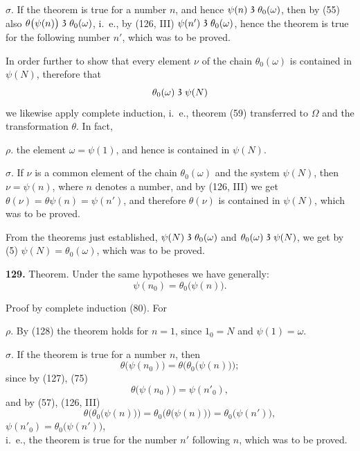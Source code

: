 \documentclass[oneside]{book}
\newcommand\partof{\mathrel{\raisebox{0.45ex}{$\mathfrak{3}$}}}   %
\newcommand\mypara{\medskip\textbf}
\begin{document}
$\sigma$. If the theorem is true for a number $n$, and hence
$\psi(n) \partof \theta_0(\omega)$, then by (55) also $\theta\bigl(\psi(n)\bigr) \partof \theta_0(\omega)$, i.~e., by
(126, III) $\psi(n') \partof \theta_0(\omega)$, hence the theorem is true for
the following number $n'$, which was to be proved.

In order further to show that every element $\nu$ of
the chain $\theta_0(\omega)$ is contained in $\psi(N)$, therefore that
\[
\theta_0(\omega) \partof \psi(N)
\]
we likewise apply complete induction, i.~e., theorem
(59) transferred to $\Omega$ and the transformation $\theta$. In
fact,

$\rho$. the element $\omega=\psi(1)$, and hence is contained in
$\psi(N)$.

$\sigma$. If $\nu$ is a common element of the chain $\theta_0(\omega)$
and the system $\psi(N)$, then $\nu=\psi(n)$, where $n$ denotes
a number, and by (126, III) we get $\theta(\nu) = \theta\psi(n) = \psi(n')$,
and therefore $\theta(\nu)$ is contained in $\psi(N)$, which
was to be proved.

From the theorems just established, $\psi(N) \partof \theta_0(\omega)$
and $\theta_0(\omega) \partof \psi(N)$, we get by (5) $\psi(N) = \theta_0(\omega)$, which
was to be proved.

\mypara{129.} Theorem. Under the same hypotheses we
have generally:
\[
\psi(n_0) = \theta_0\bigl(\psi(n)\bigr).
\]

Proof by complete induction (80). For

$\rho$. By (128) the theorem holds for $n = 1$, since
$1_0=N$ and $\psi(1)=\omega$.

$\sigma$. If the theorem is true for a number $n$, then
\[
  \theta\bigl(\psi(n_0)\bigr)
= \theta\bigl(\theta_0\bigl(\psi(n)\bigr)\bigr);
\]
since by (127), (75)
\[
\theta\bigl(\psi(n_0)\bigr) = \psi(n'_0),
\]
and by (57), (126, III)
\[
  \theta\bigl(\theta_0\bigl(\psi(n)\bigr)\bigr)
= \theta_0\bigl(\theta\bigl(\psi(n)\bigr)\bigr)
= \theta_0\bigl(\psi(n')\bigr),
\]
\hfill$
\psi(n'_0) = \theta_0\bigl(\psi(n')\bigr)$,
\hfill\null\\
i.~e., the theorem is true for the number $n'$ following
$n$, which was to be proved.
\end{document}
